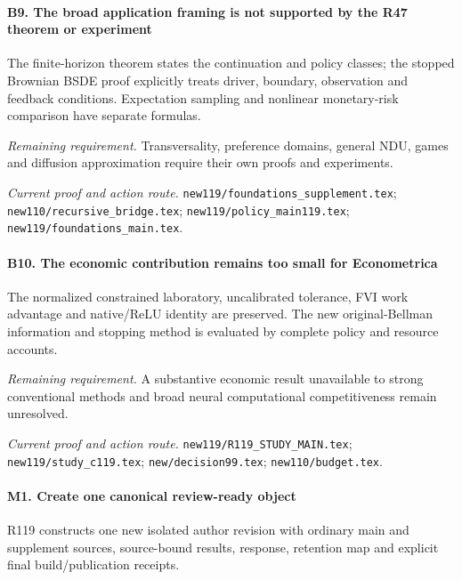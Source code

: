 \paragraph{B9. The broad application framing is not supported by the R47 theorem or experiment}

The finite-horizon theorem states the continuation and policy classes; the stopped Brownian BSDE proof explicitly treats driver, boundary, observation and feedback conditions. Expectation sampling and nonlinear monetary-risk comparison have separate formulas.

\par\emph{Remaining requirement.} Transversality, preference domains, general NDU, games and diffusion approximation require their own proofs and experiments.

\par\emph{Current proof and action route.} \nolinkurl{new119/foundations_supplement.tex}; \nolinkurl{new110/recursive_bridge.tex}; \nolinkurl{new119/policy_main119.tex}; \nolinkurl{new119/foundations_main.tex}.

\paragraph{B10. The economic contribution remains too small for Econometrica}

The normalized constrained laboratory, uncalibrated tolerance, FVI work advantage and native/\allowbreak{}ReLU identity are preserved. The new original-Bellman information and stopping method is evaluated by complete policy and resource accounts.

\par\emph{Remaining requirement.} A substantive economic result unavailable to strong conventional methods and broad neural computational competitiveness remain unresolved.

\par\emph{Current proof and action route.} \nolinkurl{new119/R119_STUDY_MAIN.tex}; \nolinkurl{new119/study_c119.tex}; \nolinkurl{new/decision99.tex}; \nolinkurl{new110/budget.tex}.

\paragraph{M1. Create one canonical review-ready object}

R119 constructs one new isolated author revision with ordinary main and supplement sources, source-bound results, response, retention map and explicit final build/\allowbreak{}publication receipts.

